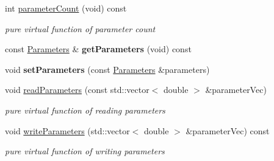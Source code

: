 \begin{DoxyCompactItemize}
\item 
\mbox{\label{classcamodocal_1_1EquidistantCamera_a6ada44a337fe2a7de4ec34486820c037}} 
int \hyperlink{classcamodocal_1_1EquidistantCamera_a6ada44a337fe2a7de4ec34486820c037}{parameter\+Count} (void) const
\begin{DoxyCompactList}\small\item\em pure virtual function of parameter count \end{DoxyCompactList}\item 
\mbox{\label{classcamodocal_1_1EquidistantCamera_afda61fe601caf9b18f4c20ff506cb8fa}} 
const \hyperlink{classcamodocal_1_1EquidistantCamera_1_1Parameters}{Parameters} \& {\bfseries get\+Parameters} (void) const
\item 
\mbox{\label{classcamodocal_1_1EquidistantCamera_af29941b207019fe3e3dc85362839de50}} 
void {\bfseries set\+Parameters} (const \hyperlink{classcamodocal_1_1EquidistantCamera_1_1Parameters}{Parameters} \&parameters)
\item 
\mbox{\label{classcamodocal_1_1EquidistantCamera_af91f10cf9a5ceb2da0ebefda2eccd358}} 
void \hyperlink{classcamodocal_1_1EquidistantCamera_af91f10cf9a5ceb2da0ebefda2eccd358}{read\+Parameters} (const std\+::vector$<$ double $>$ \&parameter\+Vec)
\begin{DoxyCompactList}\small\item\em pure virtual function of reading parameters \end{DoxyCompactList}\item 
\mbox{\label{classcamodocal_1_1EquidistantCamera_a5006b40521b778fd5d02bf5a0f83b2e1}} 
void \hyperlink{classcamodocal_1_1EquidistantCamera_a5006b40521b778fd5d02bf5a0f83b2e1}{write\+Parameters} (std\+::vector$<$ double $>$ \&parameter\+Vec) const
\begin{DoxyCompactList}\small\item\em pure virtual function of writing parameters \end{DoxyCompactList}\item 
\mbox{\label{classcamodocal_1_1EquidistantCamera_ae3142aaa34373807d929de2750e28f7a}} 

\end{DoxyCompactItemize}
